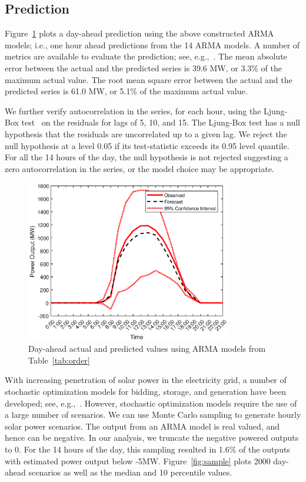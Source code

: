 \documentclass[review]{elsarticle}
\begin{document}
\subsection{Prediction}

Figure~\ref{fig:prediction} plots a day-ahead prediction using the above 
constructed ARMA models; i.e., one hour ahead predictions from the 14 ARMA 
models. A number of metrics are available to evaluate the prediction; see, 
e.g.,~\cite{coimbra2013overview}. The mean absolute error between the actual 
and the predicted series is 
39.6 MW, or  3.3\% of the maximum actual value. The root mean square 
error between the actual and the predicted series is 
61.0 MW, or  5.1\% of the maximum actual value. 

We further verify autocorrelation in the series, for each hour, using the 
Ljung-Box test~\cite{ljung1978measure} on the residuals for lags of 5, 10, 
and 15. The Ljung-Box  test has a 
null hypothesis that the residuals are uncorrelated up to a 
given lag. We reject the null hypothesis at a level 0.05 if its test-statistic 
exceeds its 
0.95 level quantile. For all the 14 hours of the day, the null hypothesis is not
rejected suggesting a zero autocorrelation in the series, or the 
model choice may be appropriate. 


\begin{figure}[!t]
\centering
\includegraphics[width=0.8\textwidth]{prediction.eps}
\caption{Day-ahead actual and predicted values using ARMA models from 
Table~\ref{tab:order}}
 \label{fig:prediction}
\end{figure}

With increasing penetration of solar power in the electricity grid, a number of 
stochastic optimization models for bidding, storage, and generation have been 
developed; see, e.g.,~\cite{banos2011optimization,sharma2012stochastic}. 
However, stochastic optimization models require the use of a large number of 
scenarios.  We can use Monte Carlo sampling to generate hourly solar power 
scenarios. The output from an ARMA model is real valued, and hence can be 
negative. In our analysis, we truncate the negative powered outputs to 0. For 
the 14 hours of 
the day, this sampling resulted in 1.6\% of the outputs with estimated power 
output below -5MW. Figure~\ref{fig:sample} plots 2000 day-ahead scenarios 
as well as the median and 10 percentile values. 
\end{document}
